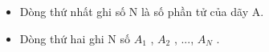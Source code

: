 \begin{itemize}
	\item     Dòng thứ nhất ghi số N là số phần tử của dãy A.   
	\item     Dòng thứ hai ghi N số $A_{1}$    , $A_{2}$    , ...,  $A_{N}$    .   
\end{itemize}
